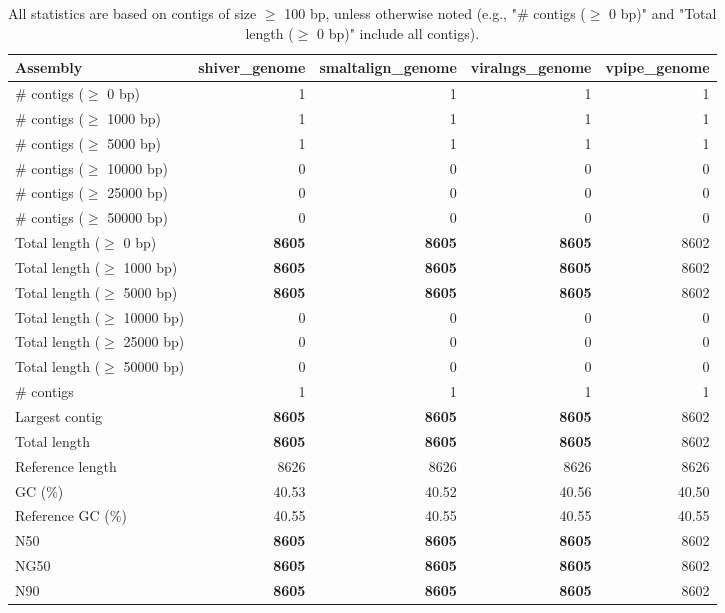 \documentclass[12pt,a4paper]{article}
\begin{document}
\begin{table}[ht]
\begin{center}
\caption{All statistics are based on contigs of size $\geq$ 100 bp, unless otherwise noted (e.g., "\# contigs ($\geq$ 0 bp)" and "Total length ($\geq$ 0 bp)" include all contigs).}
\begin{tabular}{|l*{4}{|r}|}
\hline
Assembly & shiver\_genome & smaltalign\_genome & viralngs\_genome & vpipe\_genome \\ \hline
\# contigs ($\geq$ 0 bp) & 1 & 1 & 1 & 1 \\ \hline
\# contigs ($\geq$ 1000 bp) & 1 & 1 & 1 & 1 \\ \hline
\# contigs ($\geq$ 5000 bp) & 1 & 1 & 1 & 1 \\ \hline
\# contigs ($\geq$ 10000 bp) & 0 & 0 & 0 & 0 \\ \hline
\# contigs ($\geq$ 25000 bp) & 0 & 0 & 0 & 0 \\ \hline
\# contigs ($\geq$ 50000 bp) & 0 & 0 & 0 & 0 \\ \hline
Total length ($\geq$ 0 bp) & {\bf 8605} & {\bf 8605} & {\bf 8605} & 8602 \\ \hline
Total length ($\geq$ 1000 bp) & {\bf 8605} & {\bf 8605} & {\bf 8605} & 8602 \\ \hline
Total length ($\geq$ 5000 bp) & {\bf 8605} & {\bf 8605} & {\bf 8605} & 8602 \\ \hline
Total length ($\geq$ 10000 bp) & 0 & 0 & 0 & 0 \\ \hline
Total length ($\geq$ 25000 bp) & 0 & 0 & 0 & 0 \\ \hline
Total length ($\geq$ 50000 bp) & 0 & 0 & 0 & 0 \\ \hline
\# contigs & 1 & 1 & 1 & 1 \\ \hline
Largest contig & {\bf 8605} & {\bf 8605} & {\bf 8605} & 8602 \\ \hline
Total length & {\bf 8605} & {\bf 8605} & {\bf 8605} & 8602 \\ \hline
Reference length & 8626 & 8626 & 8626 & 8626 \\ \hline
GC (\%) & 40.53 & 40.52 & 40.56 & 40.50 \\ \hline
Reference GC (\%) & 40.55 & 40.55 & 40.55 & 40.55 \\ \hline
N50 & {\bf 8605} & {\bf 8605} & {\bf 8605} & 8602 \\ \hline
NG50 & {\bf 8605} & {\bf 8605} & {\bf 8605} & 8602 \\ \hline
N90 & {\bf 8605} & {\bf 8605} & {\bf 8605} & 8602 \\ \hline

\end{tabular}
\end{center}
\end{table}
\end{document}
